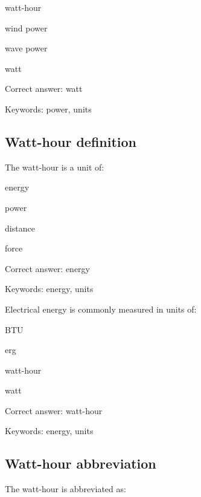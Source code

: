 \begin{answer}
	\item watt-hour
	\item wind power
	\item wave power
	\item watt
\end{answer}

Correct answer: watt

Keywords: power, units

\subsection{Watt-hour definition}

\begin{question}
	\item The watt-hour is a unit of:
\end{question}

\begin{answer}
	\item energy
	\item power
	\item distance
	\item force
\end{answer}

Correct answer: energy

Keywords: energy, units

\begin{question}
	\item Electrical energy is commonly measured in units of:
\end{question}

\begin{answer}
	\item BTU
	\item erg
	\item watt-hour
	\item watt
\end{answer}

Correct answer: watt-hour

Keywords: energy, units

\subsection{Watt-hour abbreviation}

\begin{question}
	\item The watt-hour is abbreviated as:
\end{question}

